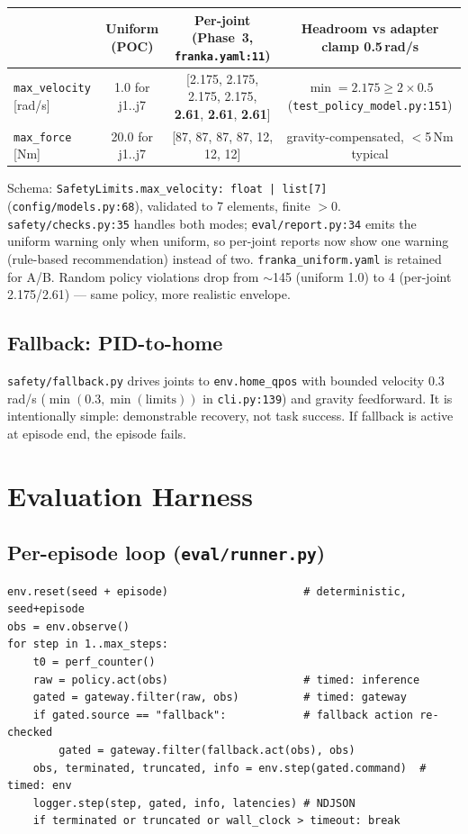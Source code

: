 \documentclass[11pt,a4paper]{article}
\begin{document}
\begin{center}
\begin{tabular}{lccc}
\toprule
 & Uniform (POC) & Per-joint (Phase~3, \texttt{franka.yaml:11}) & Headroom vs adapter clamp 0.5\,rad/s \\
\midrule
\texttt{max\_velocity} [rad/s] & 1.0 for j1..j7 & [2.175, 2.175, 2.175, 2.175, \textbf{2.61}, \textbf{2.61}, \textbf{2.61}] & $\min=2.175 \ge 2\times0.5$ \quad (\texttt{test\_policy\_model.py:151}) \\
\texttt{max\_force} [Nm] & 20.0 for j1..j7 & [87, 87, 87, 87, 12, 12, 12] & gravity-compensated, $<$5\,Nm typical \\
\bottomrule
\end{tabular}
\end{center}

Schema: \texttt{SafetyLimits.max\_velocity: float | list[7]} (\texttt{config/models.py:68}), validated to 7 elements, finite $>$0. \texttt{safety/checks.py:35} handles both modes; \texttt{eval/report.py:34} emits the uniform warning only when uniform, so per-joint reports now show one warning (rule-based recommendation) instead of two. \texttt{franka\_uniform.yaml} is retained for A/B. Random policy violations drop from $\sim$145 (uniform 1.0) to 4 (per-joint 2.175/2.61) — same policy, more realistic envelope.

\subsection{Fallback: PID-to-home}
\texttt{safety/fallback.py} drives joints to \texttt{env.home\_qpos} with bounded velocity $0.3$\,rad/s ($\min(0.3, \min(\text{limits}))$ in \texttt{cli.py:139}) and gravity feedforward. It is intentionally simple: demonstrable recovery, not task success. If fallback is active at episode end, the episode fails.

\section{Evaluation Harness}

\subsection{Per-episode loop (\texttt{eval/runner.py})}
\begin{lstlisting}[style=yaml, caption={Loop — timed at three points}, label=lst:loop]
env.reset(seed + episode)                     # deterministic, seed+episode
obs = env.observe()
for step in 1..max_steps:
    t0 = perf_counter()
    raw = policy.act(obs)                     # timed: inference
    gated = gateway.filter(raw, obs)          # timed: gateway
    if gated.source == "fallback":            # fallback action re-checked
        gated = gateway.filter(fallback.act(obs), obs)
    obs, terminated, truncated, info = env.step(gated.command)  # timed: env
    logger.step(step, gated, info, latencies) # NDJSON
    if terminated or truncated or wall_clock > timeout: break
\end{lstlisting}
\end{document}
